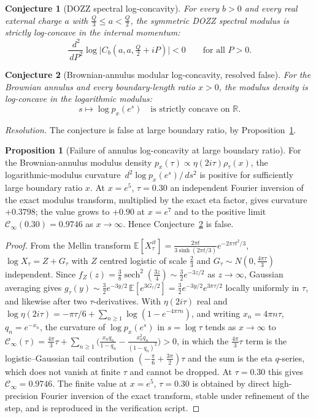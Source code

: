 \documentclass[11pt]{article}
\newtheorem{conjecture}{Conjecture}
\theoremstyle{definition}
\newcommand{\R}{\mathbb R}
\newcommand{\dd}{\,d}
\providecommand{\R}{\mathbb R}
\newtheorem{proposition}{Proposition}
\begin{document}
\begin{conjecture}[DOZZ spectral log-concavity]\label{ak1}
For every $b>0$ and every real external charge $a$ with $\tfrac Q3\le a<\tfrac Q2$, the symmetric DOZZ spectral modulus is strictly log-concave in the internal momentum:
\[
\frac{\dd^2}{\dd P^2}\log\bigl|C_b(a,a,\tfrac Q2+iP)\bigr|<0\qquad\text{for all }P>0.
\]
\end{conjecture}

\begin{conjecture}[Brownian-annulus modular log-concavity, resolved false]\label{ak2}
For the Brownian annulus and every boundary-length ratio $x>0$, the modulus density is log-concave in the logarithmic modulus:
\[
s\longmapsto\log p_x(e^s)\quad\text{is strictly concave on }\R.
\]
\end{conjecture}

\emph{Resolution.} The conjecture is false at large boundary ratio, by Proposition~\ref{ak:c2}.

\begin{proposition}[Failure of annulus log-concavity at large boundary ratio]\label{ak:c2}
For the Brownian-annulus modulus density $p_x(\tau)\propto\eta(2i\tau)\rho_\tau(x)$, the logarithmic-modulus curvature $\dd^2\log p_x(e^s)/\dd s^2$ is positive for sufficiently large boundary ratio $x$.  At $x=e^5$, $\tau=0.30$ an independent Fourier inversion of the exact modulus transform, multiplied by the exact eta factor, gives curvature $+0.3798$; the value grows to $+0.90$ at $x=e^7$ and to the positive limit $\mathcal C_\infty(0.30)=0.9746$ as $x\to\infty$.  Hence Conjecture~\ref{ak2} is false.
\end{proposition}

\begin{proof}
From the Mellin transform $\mathbb E[X_\tau^{it}]=\tfrac{2\pi t}{3\sinh(2\pi t/3)}e^{-2\pi\tau t^2/3}$, $\log X_\tau=Z+G_\tau$ with $Z$ centred logistic of scale $\tfrac23$ and $G_\tau\sim N(0,\tfrac{4\pi\tau}3)$ independent.  Since $f_Z(z)=\tfrac38\operatorname{sech}^2(\tfrac{3z}4)\sim\tfrac32e^{-3z/2}$ as $z\to\infty$, Gaussian averaging gives $g_\tau(y)\sim\tfrac32e^{-3y/2}\,\mathbb E[e^{3G_\tau/2}]=\tfrac32e^{-3y/2}e^{3\pi\tau/2}$ locally uniformly in $\tau$, and likewise after two $\tau$-derivatives.  With $\eta(2i\tau)$ real and $\log\eta(2i\tau)=-\pi\tau/6+\sum_{n\ge1}\log(1-e^{-4\pi\tau n})$, and writing $x_n=4\pi n\tau$, $q_n=e^{-x_n}$, the curvature of $\log p_x(e^s)$ in $s=\log\tau$ tends as $x\to\infty$ to $\mathcal C_\infty(\tau)=\tfrac{4\pi}3\tau+\sum_{n\ge1}\bigl(\tfrac{x_nq_n}{1-q_n}-\tfrac{x_n^2q_n}{(1-q_n)^2}\bigr)>0$, in which the $\tfrac{4\pi}3\tau$ term is the logistic--Gaussian tail contribution $(-\tfrac\pi6+\tfrac{3\pi}2)\tau$ and the sum is the eta $q$-series, which does not vanish at finite $\tau$ and cannot be dropped.  At $\tau=0.30$ this gives $\mathcal C_\infty=0.9746$.  The finite value at $x=e^5$, $\tau=0.30$ is obtained by direct high-precision Fourier inversion of the exact transform, stable under refinement of the step, and is reproduced in the verification script.
\end{proof}
\end{document}
